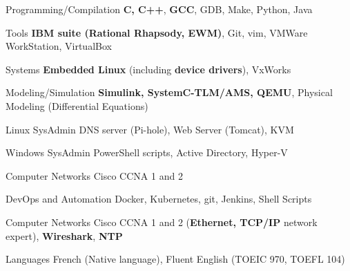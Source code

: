 

\begin{cvskills}
{

    \cvskill
    {Programming/Compilation} %
    {\textbf{C, C++}, \textbf{GCC}, GDB, Make, Python, Java} %

    \cvskill
    {Tools}
    {\textbf{IBM suite (Rational Rhapsody, EWM)}, Git, vim, VMWare WorkStation, VirtualBox}
	
	\cvskill
    {Systems}
    {\textbf{Embedded Linux} (including \textbf{device drivers}), VxWorks}
	
    \cvskill
    {Modeling/Simulation} %
    {\textbf{Simulink, SystemC-TLM/AMS, QEMU}, Physical Modeling (Differential Equations)} %

	}{}
{

    \cvskill
    {Linux SysAdmin} %
    {DNS server (Pi-hole), Web Server (Tomcat), KVM} %

    \cvskill
    {Windows SysAdmin} %
    {PowerShell scripts, Active Directory, Hyper-V} %

    \cvskill
    {Computer Networks} %
    {Cisco CCNA 1 and 2} %
	
	\cvskill
    {DevOps and Automation} %
    {Docker, Kubernetes, git, Jenkins, Shell Scripts} %

}{}
    \cvskill
    {Computer Networks} %
    {Cisco CCNA 1 and 2 (\textbf{Ethernet, TCP/IP} network expert), \textbf{Wireshark}, \textbf{NTP}} %

    \cvskill
    {Languages} %
    {French (Native language), Fluent English (TOEIC 970, TOEFL 104)} %

\end{cvskills}
